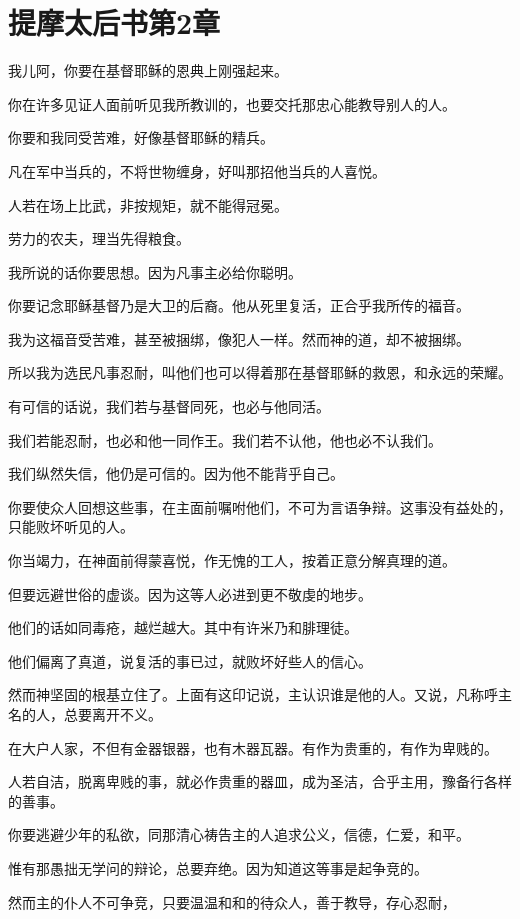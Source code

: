 \documentclass[12pt,oneside]{book}
\begin{document}
\chapter{提摩太后书第2章}
我儿阿，你要在基督耶稣的恩典上刚强起来。

你在许多见证人面前听见我所教训的，也要交托那忠心能教导别人的人。

你要和我同受苦难，好像基督耶稣的精兵。

凡在军中当兵的，不将世物缠身，好叫那招他当兵的人喜悦。

人若在场上比武，非按规矩，就不能得冠冕。

劳力的农夫，理当先得粮食。

我所说的话你要思想。因为凡事主必给你聪明。

你要记念耶稣基督乃是大卫的后裔。他从死里复活，正合乎我所传的福音。

我为这福音受苦难，甚至被捆绑，像犯人一样。然而神的道，却不被捆绑。

所以我为选民凡事忍耐，叫他们也可以得着那在基督耶稣的救恩，和永远的荣耀。

有可信的话说，我们若与基督同死，也必与他同活。

我们若能忍耐，也必和他一同作王。我们若不认他，他也必不认我们。

我们纵然失信，他仍是可信的。因为他不能背乎自己。

你要使众人回想这些事，在主面前嘱咐他们，不可为言语争辩。这事没有益处的，只能败坏听见的人。

你当竭力，在神面前得蒙喜悦，作无愧的工人，按着正意分解真理的道。

但要远避世俗的虚谈。因为这等人必进到更不敬虔的地步。

他们的话如同毒疮，越烂越大。其中有许米乃和腓理徒。

他们偏离了真道，说复活的事已过，就败坏好些人的信心。

然而神坚固的根基立住了。上面有这印记说，主认识谁是他的人。又说，凡称呼主名的人，总要离开不义。

在大户人家，不但有金器银器，也有木器瓦器。有作为贵重的，有作为卑贱的。

人若自洁，脱离卑贱的事，就必作贵重的器皿，成为圣洁，合乎主用，豫备行各样的善事。

你要逃避少年的私欲，同那清心祷告主的人追求公义，信德，仁爱，和平。

惟有那愚拙无学问的辩论，总要弃绝。因为知道这等事是起争竞的。

然而主的仆人不可争竞，只要温温和和的待众人，善于教导，存心忍耐，
\end{document}
